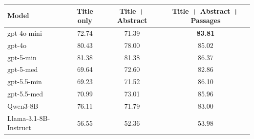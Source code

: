 \begin{tabular}{lccc}
\toprule
Model & Title only & Title + Abstract & Title + Abstract + Passages \\
\midrule
gpt-4o-mini & 72.74 & 71.39 & \textbf{83.81} \\
gpt-4o & 80.43 & 78.00 & 85.02 \\
gpt-5-min & 81.38 & 81.38 & 86.37 \\
gpt-5-med & 69.64 & 72.60 & 82.86 \\
gpt-5.5-min & 69.23 & 71.52 & 86.10 \\
gpt-5.5-med & 70.99 & 73.01 & 85.96 \\
Qwen3-8B & 76.11 & 71.79 & 83.00 \\
Llama-3.1-8B-Instruct & 56.55 & 52.36 & 53.98 \\
\bottomrule
\end{tabular}
